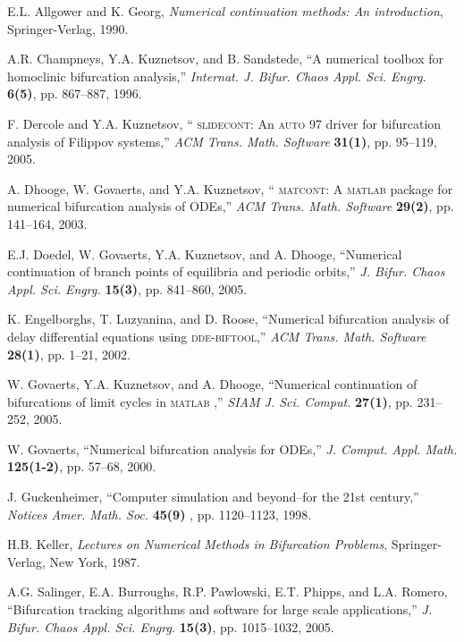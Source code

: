 \documentclass{article}
\begin{document}
\begin{thebibliography}{99}
 E.L. Allgower and K. Georg, \emph{Numerical
continuation methods: An introduction}, Springer-Verlag, 1990.

 A.R. Champneys, Y.A. Kuznetsov, and B.
Sandstede, ``A numerical toolbox for homoclinic bifurcation analysis,'' 
\emph{Internat. J. Bifur. Chaos Appl. Sci. Engrg. }\textbf{6(5)}, pp.
867--887, 1996.

 F. Dercole and Y.A. Kuznetsov, ``\textsc{%
slidecont}: An \textsc{auto} \textsc{97} driver for bifurcation analysis of
Filippov systems,'' \emph{ACM Trans. Math. Software} \textbf{31(1)}, pp.
95--119, 2005.

 A. Dhooge, W. Govaerts, and Y.A. Kuznetsov, ``%
\textsc{matcont}: A \textsc{matlab} package for numerical bifurcation
analysis of ODEs,'' \emph{ACM Trans. Math. Software} \textbf{29(2)}, pp.
141--164, 2003.

 E.J. Doedel, W. Govaerts, Y.A. Kuznetsov, and A.
Dhooge, ``Numerical continuation of branch points of equilibria and periodic
orbits,'' \emph{J. Bifur. Chaos Appl. Sci. Engrg.} \textbf{15(3)}, pp.
841--860, 2005.

 K. Engelborghs, T. Luzyanina, and D. Roose,
``Numerical bifurcation analysis of delay differential equations using 
\textsc{dde-biftool},'' \emph{ACM Trans. Math. Software} \textbf{28(1)}, pp.
1--21, 2002.

 W. Govaerts, Y.A. Kuznetsov, and A. Dhooge,
``Numerical continuation of bifurcations of limit cycles in \textsc{matlab}%
,'' \emph{SIAM J. Sci. Comput.} \textbf{27(1)}, pp. 231--252, 2005.

 W. Govaerts, ``Numerical bifurcation analysis for
ODEs,'' \emph{J. Comput. Appl. Math.} \textbf{125(1-2)}, pp. 57--68, 2000.

 J. Guckenheimer, ``Computer simulation and
beyond--for the 21st century,'' \emph{Notices Amer. Math. Soc.} \textbf{45(9)%
}, pp. 1120--1123, 1998.

 H.B. Keller, \emph{Lectures on Numerical Methods in
Bifurcation Problems}, Springer-Verlag, New York, 1987.

 A.G. Salinger, E.A. Burroughs, R.P. Pawlowski,
E.T. Phipps, and L.A. Romero, ``Bifurcation tracking algorithms and software
for large scale applications,'' \emph{J. Bifur. Chaos Appl. Sci. Engrg.} 
\textbf{15(3)}, pp. 1015--1032, 2005.


\end{thebibliography}
\end{document}
